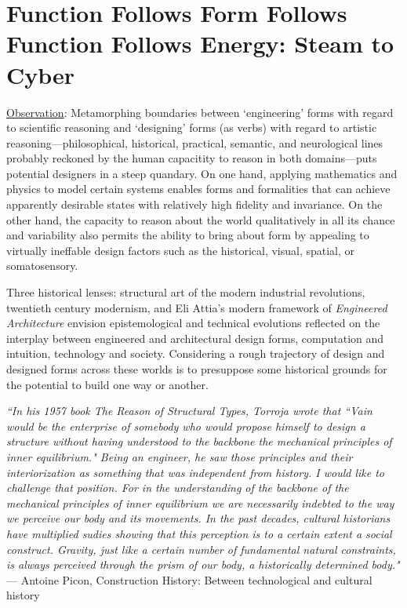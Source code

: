 \section{Function Follows Form Follows Function Follows Energy: Steam to Cyber}

\underline{Observation}: Metamorphing boundaries between `engineering' forms with regard to scientific reasoning and `designing' forms (as verbs) with regard to artistic reasoning---philosophical, historical, practical, semantic, and neurological lines probably reckoned by the human capacitity to reason in both domains---puts potential designers in a steep quandary. On one hand, applying mathematics and physics to model certain systems enables forms and formalities that can achieve apparently desirable states with relatively high fidelity and invariance. On the other hand, the capacity to reason about the world qualitatively in all its chance and variability also permits the ability to bring about form by appealing to virtually ineffable design factors such as the historical, visual, spatial, or somatosensory.

Three historical lenses: structural art of the modern industrial revolutions, twentieth century modernism, and Eli Attia's modern framework of \textit{Engineered Architecture} envision epistemological and technical evolutions reflected on the interplay between engineered and architectural design forms, computation and intuition, technology and society. Considering a rough trajectory of design and designed forms across these worlds is to presuppose some historical grounds for the potential to build one way or another. 

\begin{flushright}
  \small{
  \textit{``In his 1957 book \textrm{The Reason of Structural Types}, Torroja wrote that ``Vain would be the enterprise of somebody who would propose himself to design a structure without having understood to the backbone the mechanical principles of inner equilibrium." Being an engineer, he saw those principles and their interiorization as something that was independent from history. I would like to challenge that position. For in the understanding of the backbone of the mechanical principles of inner equilibrium we are necessarily indebted to the way we perceive our body and its movements. In the past decades, cultural historians have multiplied sudies showing that this perception is to a certain extent a social construct. Gravity, just like a certain number of fundamental natural constraints, is always perceived through the prism of our body, a historically determined body."}} \\ --- Antoine Picon, Construction History: Between technological and cultural history
\end{flushright}

